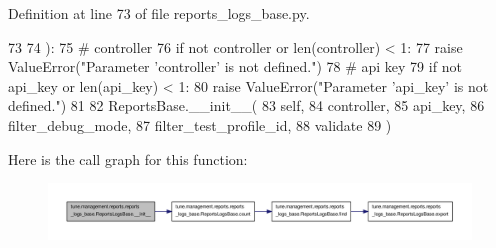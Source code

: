 Definition at line 73 of file reports\-\_\-logs\-\_\-base.\-py.


\begin{DoxyCode}
73 
74     ):
75         \textcolor{comment}{# controller}
76         \textcolor{keywordflow}{if} \textcolor{keywordflow}{not} controller \textcolor{keywordflow}{or} len(controller) < 1:
77             \textcolor{keywordflow}{raise} ValueError(\textcolor{stringliteral}{"Parameter 'controller' is not defined."})
78         \textcolor{comment}{# api key}
79         \textcolor{keywordflow}{if} \textcolor{keywordflow}{not} api\_key \textcolor{keywordflow}{or} len(api\_key) < 1:
80             \textcolor{keywordflow}{raise} ValueError(\textcolor{stringliteral}{"Parameter 'api\_key' is not defined."})
81 
82         ReportsBase.\_\_init\_\_(
83             self,
84             controller,
85             api\_key,
86             filter\_debug\_mode,
87             filter\_test\_profile\_id,
88             validate
89         )

\end{DoxyCode}


Here is the call graph for this function\-:
\nopagebreak
\begin{figure}[H]
\begin{center}
\leavevmode
\includegraphics[width=350pt]{classtune_1_1management_1_1reports_1_1reports__logs__base_1_1ReportsLogsBase_a61c9ec1789d7b39d2fe86261b38e4c1b_cgraph}
\end{center}
\end{figure}




